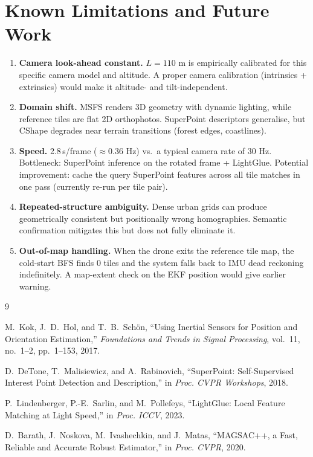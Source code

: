 \documentclass[12pt,a4paper]{article}
\begin{document}
\section{Known Limitations and Future Work}

\begin{enumerate}
    \item \textbf{Camera look-ahead constant.}
        $L = 110$ m is empirically calibrated for this specific camera model
        and altitude. A proper camera calibration (intrinsics + extrinsics)
        would make it altitude- and tilt-independent.

    \item \textbf{Domain shift.}
        MSFS renders 3D geometry with dynamic lighting, while reference tiles
        are flat 2D orthophotos. SuperPoint descriptors generalise, but
        CShape degrades near terrain transitions (forest edges, coastlines).

    \item \textbf{Speed.}
        2.8\,s/frame ($\approx 0.36$ Hz) vs.\ a typical camera rate of 30 Hz.
        Bottleneck: SuperPoint inference on the rotated frame + LightGlue.
        Potential improvement: cache the query SuperPoint features across all
        tile matches in one pass (currently re-run per tile pair).

    \item \textbf{Repeated-structure ambiguity.}
        Dense urban grids can produce geometrically consistent but positionally
        wrong homographies. Semantic confirmation mitigates this but does not
        fully eliminate it.

    \item \textbf{Out-of-map handling.}
        When the drone exits the reference tile map, the cold-start BFS finds
        0 tiles and the system falls back to IMU dead reckoning indefinitely.
        A map-extent check on the EKF position would give earlier warning.
\end{enumerate}

\begin{thebibliography}{9}

M.~Kok, J.~D.~Hol, and T.~B.~Sch\"{o}n,
``Using Inertial Sensors for Position and Orientation Estimation,''
\textit{Foundations and Trends in Signal Processing}, vol.~11, no.~1--2,
pp.~1--153, 2017.

D.~DeTone, T.~Malisiewicz, and A.~Rabinovich,
``SuperPoint: Self-Supervised Interest Point Detection and Description,''
in \textit{Proc. CVPR Workshops}, 2018.

P.~Lindenberger, P.-E.~Sarlin, and M.~Pollefeys,
``LightGlue: Local Feature Matching at Light Speed,''
in \textit{Proc. ICCV}, 2023.

D.~Barath, J.~Noskova, M.~Ivashechkin, and J.~Matas,
``MAGSAC++, a Fast, Reliable and Accurate Robust Estimator,''
in \textit{Proc. CVPR}, 2020.

\end{thebibliography}
\end{document}
